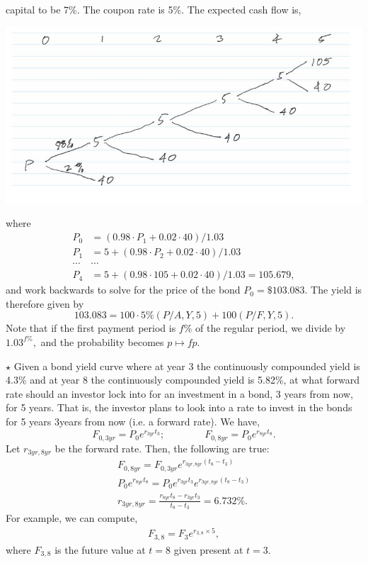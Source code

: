 \documentclass[11pt,landscape]{article}
\begin{document}
\begin{multicols*}{3}
capital to be 7\%. The coupon rate is 5\%. The expected cash flow is,
\begin{center}
    \includegraphics[width=\linewidth]{tree.jpg}
\end{center}
where 
\begin{align*}
    P_0 &= (0.98 \cdot P_1 + 0.02 \cdot 40)/1.03 \\ 
    P_1 &= 5 + (0.98 \cdot P_2 + 0.02 \cdot 40)/1.03 \\
    \cdots & \cdots \\ 
    P_4 &= 5 + (0.98 \cdot 105 + 0.02 \cdot 40)/1.03 = 105.679,
\end{align*}
and work backwards to solve for the price of the bond $P_0=\$103.083$. The yield is therefore given by 
\begin{equation*}
    103.083 = 100 \cdot 5\% (P/A,Y,5) +100(P/F,Y,5).
\end{equation*}
Note that if the first payment period is $f\%$ of the regular period, we divide by $1.03^{f\%},$ and the probability becomes $p\mapsto fp.$

$\star$ Given a bond yield curve where at year 3 the continuously compounded yield is 4.3\% and at year 8 the continuously compounded yield is 5.82\%, at what forward rate should an investor lock into for an investment in a bond, 3 years from now, for 5 years. That is, the investor plans to look into a rate to invest in the bonds for 5 years 3years from now (i.e. a forward rate). We have,
\begin{equation*}
    F_{0,3yr}=P_0e^{r_{3yr}t_3};\quad\quad\quad\quad F_{0,8yr}=P_0e^{r_{8yr}t_8}.
\end{equation*}
Let $r_{3yr,8yr}$ be the forward rate. Then, the following are true:
\begin{align*}
    F_{0,8yr} = F_{0,3yr}e^{r_{3yr,8yr}(t_8-t_3)} \\ 
    P_0e^{r_{8yr}t_8} = P_0 e^{r_{3yr}t_3}e^{r_{3yr,8yr}(t_8-t_3)} \\ 
    r_{3yr,8yr} = \frac{r_{8yr}t_8 - r_{3yr}t_3}{t_8-t_3} = 6.732\%.
\end{align*}
For example, we can compute,
\begin{align*}
    F_{3,8} = F_3e^{r_{3,8} \times 5},
\end{align*}
where $F_{3,8}$ is the future value at $t=8$ given present at $t=3.$
\end{multicols*}
\end{document}
